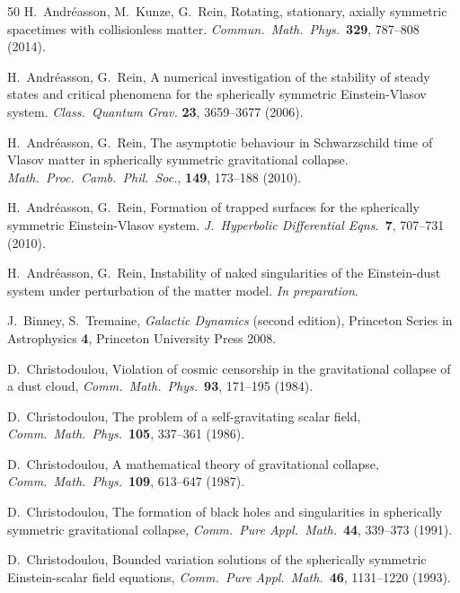 \documentclass[11pt]{article}
\begin{document}
\begin{thebibliography}{50}
  {\sc H.~Andr\'{e}asson, M.~Kunze, G.~Rein,}
  Rotating, stationary, axially symmetric spacetimes with collisionless matter.
  {\em Commun.\ Math.\ Phys.}\ {\bf 329}, 787--808 (2014).

  {\sc H.~Andr\'{e}asson, G.~Rein}, 
  A numerical investigation of the stability of steady states 
  and critical phenomena for the spherically symmetric 
  Einstein-Vlasov system.
  {\em Class.\ Quantum Grav.} {\bf 23}, 3659--3677 (2006).

  {\sc H.~Andr\'{e}asson, G.~Rein},
  The asymptotic behaviour in Schwarzschild time
  of Vlasov matter in spherically
  symmetric gravitational collapse.
  {\em Math.\ Proc.\ Camb.\ Phil.\ Soc.},
  {\bf 149}, 173--188 (2010).

  {\sc H.~Andr\'{e}asson, G.~Rein},
  Formation of trapped surfaces for the spherically symmetric
  Einstein-Vlasov system.
  {\em J.\ Hyperbolic Differential Eqns.}\ {\bf 7}, 707--731 (2010).

  {\sc H.~Andr\'{e}asson, G.~Rein},
  Instability of naked singularities of the Einstein-dust system
  under perturbation of the matter model.
  {\em In preparation}.

  {\sc J.~Binney, S.~Tremaine},
  \textit{Galactic Dynamics} (second edition),
  Princeton Series in Astrophysics {\bf4},
  Princeton University Press 2008.
  
  {\sc D.~Christodoulou},
  Violation of cosmic censorship
  in the gravitational collapse of a dust cloud,
  {\em Comm.\ Math.\ Phys.}\ {\bf 93}, 171--195 (1984). 

  {\sc D.~Christodoulou},
  The problem of a self-gravitating scalar field,
  {\em Comm.\ Math.\ Phys.}\ {\bf 105}, 337--361 (1986).
  
  {\sc D.~Christodoulou},
  A mathematical theory of gravitational collapse,
  {\em Comm.\ Math.\ Phys.}\  {\bf 109}, 613--647 (1987).
  
  {\sc D.~Christodoulou},
  The formation of black holes and singularities in spherically symmetric
  gravitational collapse,
  {\em Comm.\ Pure Appl.\ Math.}\  {\bf 44}, 339--373  (1991).
  
  {\sc D.~Christodoulou},
  Bounded variation solutions of the spherically symmetric
  Einstein-scalar field equations,
  {\em Comm.\ Pure Appl.\ Math.}\  {\bf 46}, 1131--1220  (1993).


\end{thebibliography}
\end{document}
